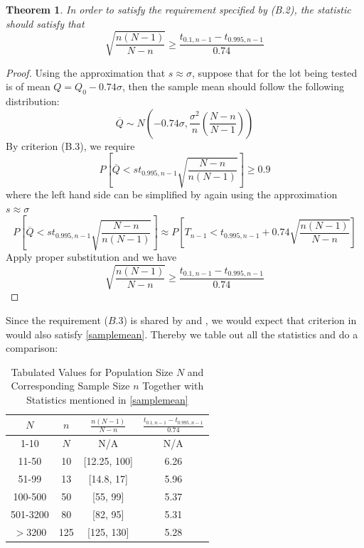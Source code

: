\documentclass[12pt]{article}
\newtheorem{theorem}{Theorem}[section]
\begin{document}
\begin{theorem}
    In order to satisfy the requirement specified by (B.2), the statistic should satisfy that
    \begin{equation}\label{samplemean}
        \sqrt{\dfrac{n(N-1)}{N-n}} \geq \dfrac{t_{0.1,n-1} - t_{0.995,n-1}}{0.74}
    \end{equation}
\end{theorem}

\begin{proof}
    Using the approximation that $s\approx\sigma$, suppose that for the lot being tested is of mean $Q = Q_0 - 0.74\sigma$, then the sample mean should follow the following distribution:
    $$
    \overline{Q} \sim N\left( -0.74\sigma, \dfrac{\sigma^2}{n}\left( \dfrac{N-n}{N-1} \right) \right)
    $$
    By criterion (B.3), we require
    $$
    P\left[ \overline{Q} < st_{0.995, n-1}\sqrt{\dfrac{N-n}{n(N-1)}} \right] \geq 0.9
    $$
    where the left hand side can be simplified by again using the approximation $s\approx\sigma$
    $$
    P\left[ \overline{Q} < st_{0.995, n-1}\sqrt{\dfrac{N-n}{n(N-1)}} \right] \approx P\left[ T_{n-1} < t_{0.995,n-1} + 0.74\sqrt{\dfrac{n(N-1)}{N-n}} \right]
    $$
    Apply proper substitution and we have
    $$
    \sqrt{\dfrac{n(N-1)}{N-n}} \geq \dfrac{t_{0.1,n-1} - t_{0.995,n-1}}{0.74}
    $$
\end{proof}

Since the requirement ($B.3$) is shared by \cite{JJF2005} and \cite{OIML2016}, we would expect that criterion in \cite{JJF2005} would also satisfy \eqref{samplemean}. Thereby we table out all the statistics and do a comparison:

\begin{table}[htbp]
    \centering
    \begin{tabular}{cccc}
        \toprule
        $N$ & $n$ & $\frac{n(N-1)}{N-n}$ & $\frac{t_{0.1,n-1} - t_{0.995,n-1}}{0.74}$ \\
        \midrule
        1-10 & $N$ & N/A & N/A \\
        11-50 & 10 & [12.25, 100] & 6.26 \\
        51-99 & 13 & [14.8, 17] & 5.96 \\
        100-500 & 50 & [55, 99] & 5.37 \\ 
        501-3200 & 80 & [82, 95] & 5.31 \\
        $>$3200 & 125 & [125, 130] & 5.28 \\
        \bottomrule
    \end{tabular}
    \caption{Tabulated Values for Population Size $N$ and Corresponding Sample Size $n$ Together with Statistics mentioned in \eqref{samplemean}}
\end{table}
\end{document}
